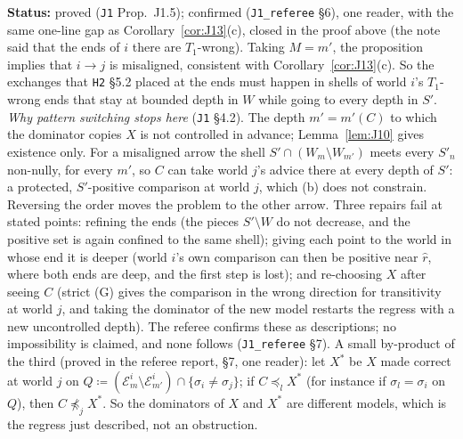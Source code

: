 \documentclass[11pt]{article}
\theoremstyle{definition}
\theoremstyle{remark}
\newcommand{\src}[1]{\texttt{#1}}
\newcommand{\status}[1]{\par\smallskip\noindent\textbf{Status:} #1\par\smallskip}
\begin{document}
\status{proved (\src{J1} Prop.~J1.5); confirmed (\src{J1\_referee} \S6), one reader, with the same one-line gap as Corollary~\ref{cor:J13}(c), closed in the proof above (the note said that the ends of $i$ there are $T_1$-wrong). Taking $M=m'$, the proposition implies that $i\to j$ is misaligned, consistent with Corollary~\ref{cor:J13}(c). So the exchanges that \src{H2} \S5.2 placed at the ends must happen in shells of world $i$'s $T_1$-wrong ends that stay at bounded depth in $W$ while going to every depth in $S'$. \emph{Why pattern switching stops here} (\src{J1} \S4.2). The depth $m'=m'(C)$ to which the dominator copies $X$ is not controlled in advance; Lemma~\ref{lem:J10} gives existence only. For a misaligned arrow the shell $S'\cap(W_m\setminus W_{m'})$ meets every $S'_n$ non-nully, for every $m'$, so $C$ can take world $j$'s advice there at every depth of $S'$: a protected, $S'$-positive comparison at world $j$, which (b) does not constrain. Reversing the order moves the problem to the other arrow. Three repairs fail at stated points: refining the ends (the pieces $S'\setminus W$ do not decrease, and the positive set is again confined to the same shell); giving each point to the world in whose end it is deeper (world $i$'s own comparison can then be positive near $\hat r$, where both ends are deep, and the first step is lost); and re-choosing $X$ after seeing $C$ (strict (G) gives the comparison in the wrong direction for transitivity at world $j$, and taking the dominator of the new model restarts the regress with a new uncontrolled depth). The referee confirms these as descriptions; no impossibility is claimed, and none follows (\src{J1\_referee} \S7). A small by-product of the third (proved in the referee report, \S7, one reader): let $X^*$ be $X$ made correct at world $j$ on $Q\coloneqq(\mathcal E^i_m\setminus\mathcal E^i_{m'})\cap\{\sigma_i\ne\sigma_j\}$; if $C\preceq_lX^*$ (for instance if $\sigma_l=\sigma_i$ on $Q$), then $C\not\preceq_jX^*$. So the dominators of $X$ and $X^*$ are different models, which is the regress just described, not an obstruction.}
\end{document}
